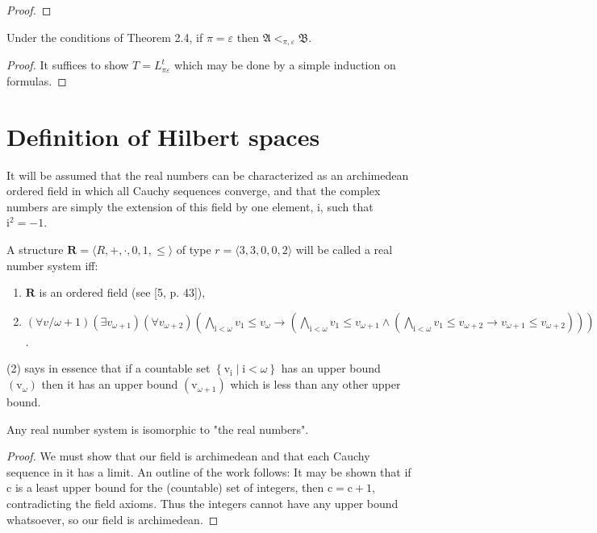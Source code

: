 \documentclass{article}
\begin{document}
{{{\begin{proof}
\end{proof}
\begin{corollary}
Under the conditions of Theorem 2.4, if $\pi=\varepsilon$ then $\mathfrak{A} <_{\pi, \varepsilon} \mathfrak{B}$.
\end{corollary}
\begin{proof}
It suffices to show $T=L_{\pi \varepsilon}^{t}$ which may be done by a simple induction on formulas.
\end{proof}
\section{Definition of Hilbert spaces}
It will be assumed that the real numbers can be characterized as an archimedean ordered field in which all Cauchy sequences converge, and that the complex numbers are simply the extension of this field by one element, i, such that $\mathrm{i}^{2}=-1$.
\begin{definition}
A structure $\mathbf{R}=\langle R,+, \cdot, 0,1, \leq\rangle$ of type $r=\langle 3,3,0,0,2\rangle$ will be called a real number system iff:
\begin{enumerate}
\item $\mathbf{R}$ is an ordered field (see [5, p. 43]),
\item $(\forall v / \omega+1)\left(\exists v_{\omega+1}\right)\left(\forall v_{\omega+2}\right)\left(\bigwedge_{\mathrm{i}<\omega} v_{1} \leq v_{\omega} \rightarrow\left(\bigwedge_{\mathrm{i}<\omega} v_{1} \leq v_{\omega+1} \wedge\left(\bigwedge_{\mathrm{i}<\omega} v_{1} \leq v_{\omega+2} \rightarrow v_{\omega+1} \leq v_{\omega+2}\right)\right)\right)$.
\end{enumerate}
\end{definition}
(2) says in essence that if a countable set $\left\{\mathrm{v}_{\mathrm{i}} \mid \mathrm{i}<\omega\right\}$ has an upper bound $\left(\mathrm{v}_{\omega}\right)$ then it has an upper bound $\left(\mathrm{v}_{\omega+1}\right)$ which is less than any other upper bound.
\begin{theorem}
Any real number system is isomorphic to "the real numbers".
\end{theorem}
\begin{proof}
We must show that our field is archimedean and that each Cauchy sequence in it has a limit. An outline of the work follows: It may be shown that if c is a least upper bound for the (countable) set of integers, then $\mathrm{c}=\mathrm{c}+1$, contradicting the field axioms. Thus the integers cannot have any upper bound whatsoever, so our field is archimedean.

\end{proof}}}}
\end{document}
